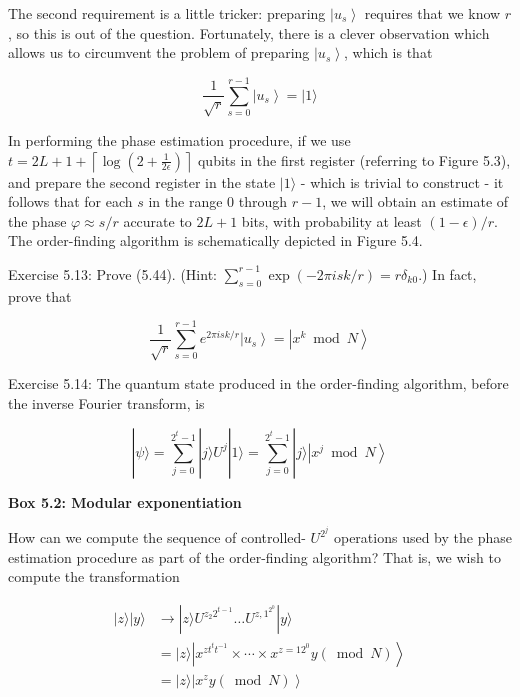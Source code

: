 The second requirement is a little tricker: preparing $\left|u_{s}\right\rangle$ requires that we know $r$, so this is out of the question. Fortunately, there is a clever observation which allows us to circumvent the problem of preparing $\left|u_{s}\right\rangle$, which is that

\begin{equation*}
\frac{1}{\sqrt{r}} \sum_{s=0}^{r-1}\left|u_{s}\right\rangle=|1\rangle \tag{5.44}
\end{equation*}

In performing the phase estimation procedure, if we use $t=2 L+1+\left\lceil\log \left(2+\frac{1}{2 \epsilon}\right)\right\rceil$ qubits in the first register (referring to Figure 5.3), and prepare the second register in the state $|1\rangle$ - which is trivial to construct - it follows that for each $s$ in the range 0 through $r-1$, we will obtain an estimate of the phase $\varphi \approx s / r$ accurate to $2 L+1$ bits, with probability at least $(1-\epsilon) / r$. The order-finding algorithm is schematically depicted in Figure 5.4.

Exercise 5.13: Prove (5.44). (Hint: $\sum_{s=0}^{r-1} \exp (-2 \pi i s k / r)=r \delta_{k 0}$.) In fact, prove that

\begin{equation*}
\frac{1}{\sqrt{r}} \sum_{s=0}^{r-1} e^{2 \pi i s k / r}\left|u_{s}\right\rangle=\left|x^{k} \bmod N\right\rangle \tag{5.45}
\end{equation*}

Exercise 5.14: The quantum state produced in the order-finding algorithm, before the inverse Fourier transform, is

\begin{equation*}
|\psi\rangle=\sum_{j=0}^{2^{t}-1}|j\rangle U^{j}|1\rangle=\sum_{j=0}^{2^{t}-1}|j\rangle\left|x^{j} \bmod N\right\rangle \tag{5.46}
\end{equation*}

\textbf{Box 5.2: Modular exponentiation}

How can we compute the sequence of controlled- $U^{2^{j}}$ operations used by the phase estimation procedure as part of the order-finding algorithm? That is, we wish to compute the transformation


\begin{align*}
|z\rangle|y\rangle & \rightarrow|z\rangle U^{z_{2} 2^{t-1}} \ldots U^{z, 1^{2^{0}}}|y\rangle  \tag{5.40}\\
& =|z\rangle\left|x^{z t^{t} t^{-1}} \times \cdots \times x^{z=12^{0}} y(\bmod N)\right\rangle  \tag{5.41}\\
& =|z\rangle\left|x^{z} y(\bmod N)\right\rangle  \tag{5.42}
\end{align*}


